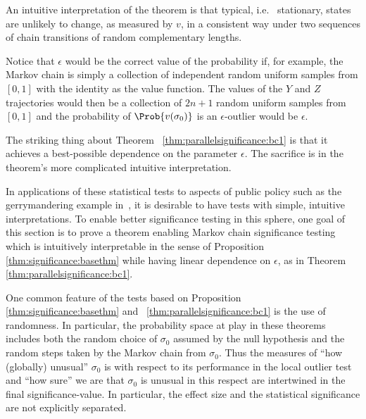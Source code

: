 \documentclass[12pt]{article}
\begin{document}
\begin{remark}
    An intuitive interpretation of the theorem is that typical, i.e.\ %
    stationary, states are unlikely to change, as measured by \( v \),
    in a consistent way under two sequences of chain transitions of
    random complementary lengths.
\end{remark}

\begin{remark}
    Notice that \( \epsilon \) would be the correct value of the
    probability if, for example, the Markov chain is simply a collection
    of independent random uniform samples from \( [0,1] \) with the
    identity as the value function.  The values of the \( Y \) and \( Z \)
    trajectories would then be a collection of \( 2n + 1 \) random
    uniform samples from \( [0,1] \) and the probability of \( \Prob{v(\sigma_0)}
    \) is an \( \epsilon \)-outlier would be \( \epsilon \).

    The striking thing about Theorem~%
    \ref{thm:parallelsignificance:bc1} is that it achieves a best-possible
    dependence on the parameter \( \epsilon \).  The sacrifice is in the
    theorem's more complicated intuitive interpretation.

    In applications of these statistical tests to aspects of public
    policy such as the gerrymandering example in~\cite{doi:10.1080/2330443X.2020.1806763}, it is desirable to have tests with simple, intuitive
    interpretations.  To enable better significance testing in this
    sphere, one goal of this section is to prove a theorem enabling
    Markov chain significance testing which is intuitively interpretable
    in the sense of Proposition~%
    \ref{thm:significance:basethm} while having linear dependence on \(
    \epsilon \), as in Theorem~%
    \ref{thm:parallelsignificance:bc1}.
\end{remark}

\begin{remark}
    One common feature of the tests based on Proposition~%
    \ref{thm:significance:basethm} and~%
    \ref{thm:parallelsignificance:bc1} is the use of randomness.  In particular,
    the probability space at play in these theorems includes both the
    random choice of \( \sigma_0 \) assumed by the null hypothesis and
    the random steps taken by the Markov chain from \( \sigma_0 \).
    Thus the measures of ``how (globally) unusual'' \( \sigma_0 \) is
    with respect to its performance in the local outlier test and ``how
    sure'' we are that \( \sigma_0 \) is unusual in this respect are
    intertwined in the final significance-value.  In particular, the effect
    size and the statistical significance are not explicitly separated.
\end{remark}
\end{document}
